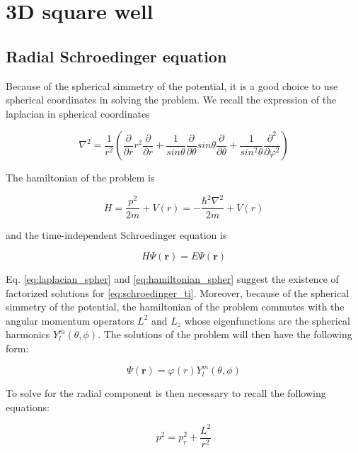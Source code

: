 \documentclass{article}
\begin{document}
\section{3D square well}

\subsection{Radial Schroedinger equation}
Because of the spherical simmetry of the potential, it is a good choice to use spherical coordinates in solving the problem. We recall the expression of the laplacian in spherical coordinates

\begin{equation}
\label{eq:laplacian_spher}
\nabla^2 = \frac{1}{r^2} \left( \frac{\partial}{\partial r} r^2 \frac{\partial}{\partial r} + \frac{1}{sin\theta} \frac{\partial}{\partial \theta} sin\theta \frac{\partial}{\partial \theta} + \frac{1}{sin^2\theta} \frac{\partial^2}{\partial \varphi^2} \right)
\end{equation}

The hamiltonian of the problem is

\begin{equation}
\label{eq:hamiltonian_spher}
H = \frac{p^2}{2m} + V(r) = -\frac{\hbar^2 \nabla^2}{2m} + V(r)
\end{equation}

and the time-independent Schroedinger equation is

\begin{equation}
\label{eq:schroedinger_ti}
H\Psi(\bm{r}) = E\Psi(\bm{r})
\end{equation}

Eq. \eqref{eq:laplacian_spher} and \eqref{eq:hamiltonian_spher} suggest the existence of factorized solutions for \eqref{eq:schroedinger_ti}. Moreover, because of the spherical simmetry of the potential, the hamiltonian of the problem commutes with the angular momentum operators \(L^2\) and \(L_{z}\) whose eigenfunctions are the spherical harmonics \(Y_{l}^m(\theta,\phi)\). The solutions of the problem will then have the following form:

\begin{equation}
\label{eq:factorized_psi}
\Psi(\bm{r}) = \varphi(r) Y_{l}^m(\theta,\phi)
\end{equation}

To solve for the radial component is then necessary to recall the following equations:

\begin{equation}
\label{eq:p2_decomposed}
p^2 = p_{r}^2 + \frac{L^2}{r^2}
\end{equation}
\end{document}

